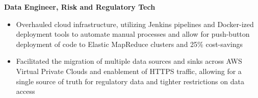 \documentclass[11pt]{article}
\begin{document}
\textbf{Data Engineer, Risk and Regulatory Tech}
\begin{itemize}
  \item Overhauled cloud infrastructure, utilizing Jenkins pipelines and
        Docker-ized deployment tools to automate manual processes and allow for
        push-button deployment of code to Elastic MapReduce clusters and 25\% cost-savings
  \item Facilitated the migration of multiple data sources and sinks across AWS Virtual
        Private Clouds and enablement of HTTPS traffic, allowing for a single source
        of truth for regulatory data and tighter restrictions on data access
\end{itemize}



% 
\end{document}

